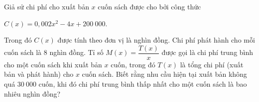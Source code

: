 \begin{ex}%
Giả sử chi phí cho xuất bản $x$ cuốn sách được cho bởi công thức 
\begin{center}
	$C(x)=0{,}002x^2-4x+200\ 000$.
\end{center} 
Trong đó  $C(x)$ được tính theo đơn vị là nghìn đồng. Chi phí phát hành cho mỗi cuốn sách là $8$ nghìn đồng. Tỉ số $M(x)=\dfrac{T(x)}{x}$ được gọi là chi phí trung bình cho một cuốn sách khi xuất bản $x$ cuốn, trong đó $T(x)$ là tổng chi phí (xuất bản và phát hành) cho $x$ cuốn sách. Biết rằng nhu cầu hiện tại xuất bản không quá $30\ 000$ cuốn, khi đó chi phí trung bình thấp nhất cho một cuốn sách là bao nhiêu nghìn đồng?
\end{ex}


